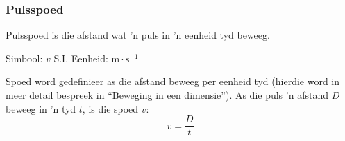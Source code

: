 \subsubsection*{Pulsspoed}
            \nopagebreak
\par
            { \label{m38801*meaningfhsst!!!underscore!!!id145}
        \label{m38801*id313292}Pulsspoed is die afstand wat 'n puls in 'n eenheid tyd beweeg. \par 
	    Simbool: $v$ \hspace{2cm} S.I. Eenheid: $\text{m}\cdot \text{s}^{-1}$
         } 
        
Spoed word gedefinieer as die afstand beweeg per eenheid tyd (hierdie word in meer detail bespreek in ``Beweging in een dimensie''). As die puls 'n afstand $D$ beweeg in 'n tyd $t$, is die spoed $v$:
        \label{m38801*uid4}\nopagebreak\noindent{}
    \begin{equation}
    \boxed{v=\frac{D}{t}}\nonumber
      \end{equation}
\par
            \label{m38801*secfhsst!!!underscore!!!id161}\vspace{.5cm} 
      \noindent



